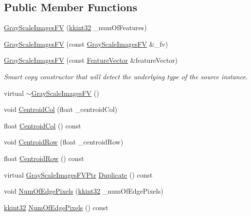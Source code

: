 \subsection*{Public Member Functions}
\begin{DoxyCompactItemize}
\item 
\hyperlink{class_k_k_m_l_l_1_1_gray_scale_images_f_v_a8bd23d5fe796ba65514535c6485c095e}{Gray\+Scale\+Images\+FV} (\hyperlink{namespace_k_k_b_a8fa4952cc84fda1de4bec1fbdd8d5b1b}{kkint32} \+\_\+num\+Of\+Features)
\item 
\hyperlink{class_k_k_m_l_l_1_1_gray_scale_images_f_v_a2d01630e6ec33f69de530df761ee2dc5}{Gray\+Scale\+Images\+FV} (const \hyperlink{class_k_k_m_l_l_1_1_gray_scale_images_f_v}{Gray\+Scale\+Images\+FV} \&\+\_\+fv)
\item 
\hyperlink{class_k_k_m_l_l_1_1_gray_scale_images_f_v_a10298197fd84a950d9e992010f64098c}{Gray\+Scale\+Images\+FV} (const \hyperlink{class_k_k_m_l_l_1_1_feature_vector}{Feature\+Vector} \&feature\+Vector)
\begin{DoxyCompactList}\small\item\em Smart copy constructor that will detect the underlying type of the source instance. \end{DoxyCompactList}\item 
virtual \hyperlink{class_k_k_m_l_l_1_1_gray_scale_images_f_v_a2a5fe2deafd3344579553162d6e0518f}{$\sim$\+Gray\+Scale\+Images\+FV} ()
\item 
void \hyperlink{class_k_k_m_l_l_1_1_gray_scale_images_f_v_af92738424e98b42e8722cde7bbb70724}{Centroid\+Col} (float \+\_\+centroid\+Col)
\item 
float \hyperlink{class_k_k_m_l_l_1_1_gray_scale_images_f_v_a7b14c65be2e682cf789d3119ef677b9f}{Centroid\+Col} () const 
\item 
void \hyperlink{class_k_k_m_l_l_1_1_gray_scale_images_f_v_a8224a1107956f70cb2c06f7c78a7e33d}{Centroid\+Row} (float \+\_\+centroid\+Row)
\item 
float \hyperlink{class_k_k_m_l_l_1_1_gray_scale_images_f_v_a57898b811bea5ba0a0a98d888394231e}{Centroid\+Row} () const 
\item 
virtual \hyperlink{class_k_k_m_l_l_1_1_gray_scale_images_f_v_af5c112fdba5e66d936a4bb19b14f41a9}{Gray\+Scale\+Images\+F\+V\+Ptr} \hyperlink{class_k_k_m_l_l_1_1_gray_scale_images_f_v_a5d6c8bec9a1f6d6845f01305691fb0b4}{Duplicate} () const 
\item 
void \hyperlink{class_k_k_m_l_l_1_1_gray_scale_images_f_v_a239c663da39285f72d04f80f2c0ce8ef}{Num\+Of\+Edge\+Pixels} (\hyperlink{namespace_k_k_b_a8fa4952cc84fda1de4bec1fbdd8d5b1b}{kkint32} \+\_\+num\+Of\+Edge\+Pixels)
\item 
\hyperlink{namespace_k_k_b_a8fa4952cc84fda1de4bec1fbdd8d5b1b}{kkint32} \hyperlink{class_k_k_m_l_l_1_1_gray_scale_images_f_v_a7a48d02e71b7f68551a1ece3d7b19e59}{Num\+Of\+Edge\+Pixels} () const 
\end{DoxyCompactItemize}
